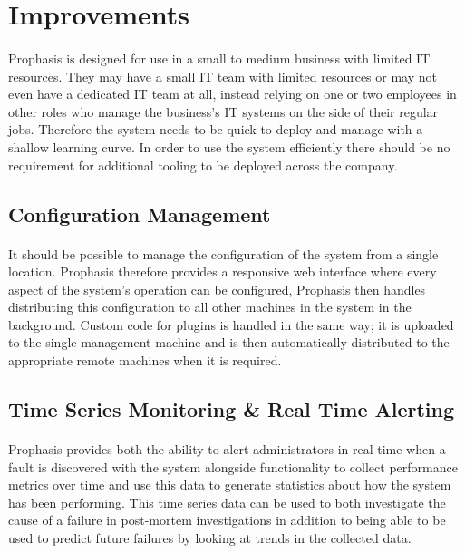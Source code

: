 \documentclass[bsc,logo,twoside,singlespacing]{infthesis}
\begin{document}
\section{Improvements}
\paragraph*{}
	Prophasis is designed for use in a small to medium business with limited IT
	resources.  They may have a small IT team with limited resources or may not
	even have a dedicated IT team at all, instead relying on one or two employees
	in other roles who manage the business's IT systems on the side of their
	regular jobs. Therefore the system needs to be quick to deploy and manage with
	a shallow learning curve. In order to use the system efficiently there should
	be no requirement for additional tooling to be deployed across the company.

\subsection{Configuration Management}
\paragraph*{}
	It should be possible to manage the configuration of the system from a single
	location.  Prophasis therefore provides a responsive web interface where every
	aspect of the system's operation can be configured, Prophasis then handles
	distributing this configuration to all other machines in the system in the
	background. Custom code for plugins is handled in the same way; it is uploaded
	to the single management machine and is then automatically distributed to the
	appropriate remote machines when it is required.

\subsection{Time Series Monitoring \& Real Time Alerting}
\paragraph*{}
	Prophasis provides both the ability to alert administrators in real time when a
	fault is discovered with the system alongside functionality to collect
	performance metrics over time and use this data to generate statistics about
	how the system has been performing.  This time series data can be used to both
	investigate the cause of a failure in post-mortem investigations in addition to
	being able to be used to predict future failures by looking at trends in the
	collected data.
\end{document}
